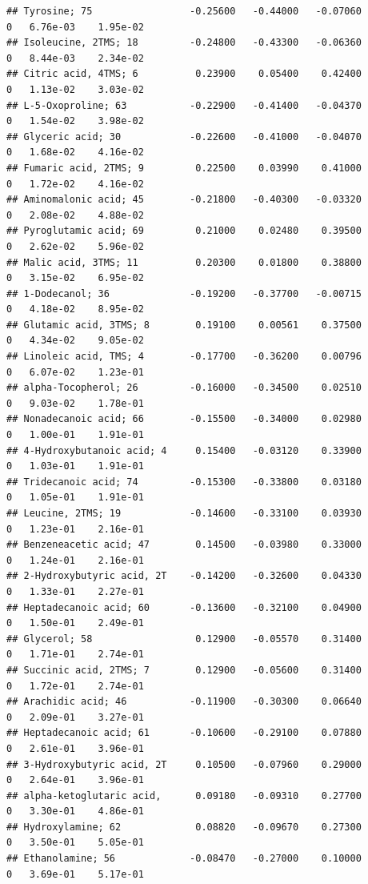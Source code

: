 \documentclass[]{article}
\begin{document}
\begin{verbatim}
## Tyrosine; 75                 -0.25600   -0.44000   -0.07060         0   6.76e-03    1.95e-02
## Isoleucine, 2TMS; 18         -0.24800   -0.43300   -0.06360         0   8.44e-03    2.34e-02
## Citric acid, 4TMS; 6          0.23900    0.05400    0.42400         0   1.13e-02    3.03e-02
## L-5-Oxoproline; 63           -0.22900   -0.41400   -0.04370         0   1.54e-02    3.98e-02
## Glyceric acid; 30            -0.22600   -0.41000   -0.04070         0   1.68e-02    4.16e-02
## Fumaric acid, 2TMS; 9         0.22500    0.03990    0.41000         0   1.72e-02    4.16e-02
## Aminomalonic acid; 45        -0.21800   -0.40300   -0.03320         0   2.08e-02    4.88e-02
## Pyroglutamic acid; 69         0.21000    0.02480    0.39500         0   2.62e-02    5.96e-02
## Malic acid, 3TMS; 11          0.20300    0.01800    0.38800         0   3.15e-02    6.95e-02
## 1-Dodecanol; 36              -0.19200   -0.37700   -0.00715         0   4.18e-02    8.95e-02
## Glutamic acid, 3TMS; 8        0.19100    0.00561    0.37500         0   4.34e-02    9.05e-02
## Linoleic acid, TMS; 4        -0.17700   -0.36200    0.00796         0   6.07e-02    1.23e-01
## alpha-Tocopherol; 26         -0.16000   -0.34500    0.02510         0   9.03e-02    1.78e-01
## Nonadecanoic acid; 66        -0.15500   -0.34000    0.02980         0   1.00e-01    1.91e-01
## 4-Hydroxybutanoic acid; 4     0.15400   -0.03120    0.33900         0   1.03e-01    1.91e-01
## Tridecanoic acid; 74         -0.15300   -0.33800    0.03180         0   1.05e-01    1.91e-01
## Leucine, 2TMS; 19            -0.14600   -0.33100    0.03930         0   1.23e-01    2.16e-01
## Benzeneacetic acid; 47        0.14500   -0.03980    0.33000         0   1.24e-01    2.16e-01
## 2-Hydroxybutyric acid, 2T    -0.14200   -0.32600    0.04330         0   1.33e-01    2.27e-01
## Heptadecanoic acid; 60       -0.13600   -0.32100    0.04900         0   1.50e-01    2.49e-01
## Glycerol; 58                  0.12900   -0.05570    0.31400         0   1.71e-01    2.74e-01
## Succinic acid, 2TMS; 7        0.12900   -0.05600    0.31400         0   1.72e-01    2.74e-01
## Arachidic acid; 46           -0.11900   -0.30300    0.06640         0   2.09e-01    3.27e-01
## Heptadecanoic acid; 61       -0.10600   -0.29100    0.07880         0   2.61e-01    3.96e-01
## 3-Hydroxybutyric acid, 2T     0.10500   -0.07960    0.29000         0   2.64e-01    3.96e-01
## alpha-ketoglutaric acid,      0.09180   -0.09310    0.27700         0   3.30e-01    4.86e-01
## Hydroxylamine; 62             0.08820   -0.09670    0.27300         0   3.50e-01    5.05e-01
## Ethanolamine; 56             -0.08470   -0.27000    0.10000         0   3.69e-01    5.17e-01

\end{verbatim}
\end{document}
